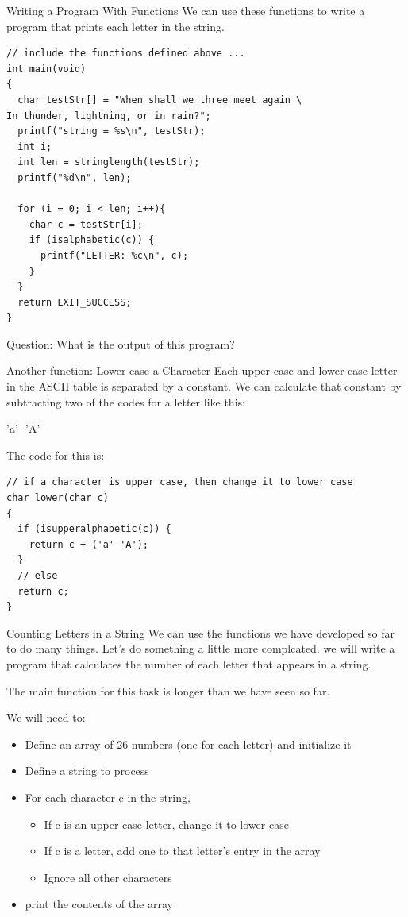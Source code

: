 \documentclass[10pt]{beamer}
\begin{document}
\begin{frame}[fragile]{Writing a Program With Functions}
We can use these functions to write a program that prints each letter in the string.
\fontsize{8pt}{8pt}\selectfont
\begin{verbatim}
// include the functions defined above ...
int main(void)
{
  char testStr[] = "When shall we three meet again \
In thunder, lightning, or in rain?";
  printf("string = %s\n", testStr);
  int i;
  int len = stringlength(testStr);
  printf("%d\n", len);

  for (i = 0; i < len; i++){
    char c = testStr[i];
    if (isalphabetic(c)) {
      printf("LETTER: %c\n", c);
    }
  }
  return EXIT_SUCCESS;
}
\end{verbatim}

Question: What is the output of this program?

\end{frame}
\begin{frame}[fragile]{Another function: Lower-case a Character}
Each upper case and lower case letter in the ASCII table is separated by a constant.  We can calculate that constant by subtracting two of the codes for a letter like this:

'a' -'A'

The code for this is:
\begin{verbatim}
// if a character is upper case, then change it to lower case
char lower(char c)
{
  if (isupperalphabetic(c)) {
    return c + ('a'-'A');
  }
  // else
  return c;
}
\end{verbatim}


\end{frame}
\begin{frame}[fragile]{Counting Letters in a String}
We can use the functions we have developed so far to do many things.  Let's do something a little more complcated.  we will write a program that calculates the number of each letter that appears in a string.  

The main function for this task is longer than we have seen so far.

We will need to:
\begin{itemize}
\item Define an array of 26 numbers (one for each letter) and initialize it
\item Define a string to process
\item For each character c in the string,
\begin{itemize}
\item If c is an upper case letter, change it to lower case
\item If c is a letter, add one to that letter's entry in the array
\item Ignore all other characters
\end{itemize}
\item print the contents of the array
\end{itemize}

\end{frame}
\end{document}
